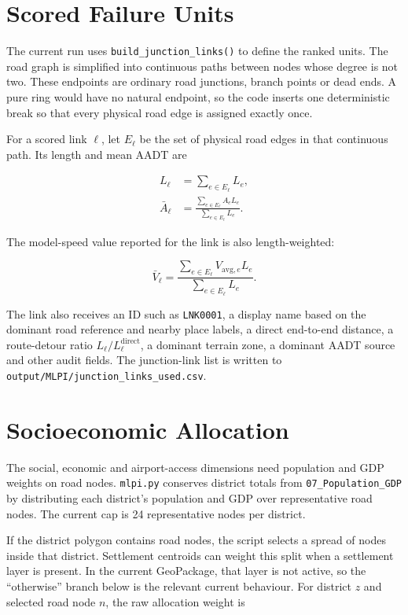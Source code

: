 \documentclass[11pt,a4paper]{article}
\begin{document}
\section{Scored Failure Units}

The current run uses \texttt{build\_junction\_links()} to define the ranked
units. The road graph is simplified into continuous paths between nodes whose
degree is not two. These endpoints are ordinary road junctions, branch points
or dead ends. A pure ring would have no natural endpoint, so the code inserts
one deterministic break so that every physical road edge is assigned exactly
once.

For a scored link $\ell$, let $E_{\ell}$ be the set of physical road edges in
that continuous path. Its length and mean AADT are

\begin{align}
L_{\ell} &= \sum_{e\in E_{\ell}} L_e, \\
\bar{A}_{\ell}
&=\frac{\sum_{e\in E_{\ell}} A_e L_e}
        {\sum_{e\in E_{\ell}} L_e}.
\label{eq:mlpi-link-aadt}
\end{align}

The model-speed value reported for the link is also length-weighted:

\begin{equation}
\bar{V}_{\ell}
=\frac{\sum_{e\in E_{\ell}} V_{\mathrm{avg},e} L_e}
        {\sum_{e\in E_{\ell}} L_e}.
\label{eq:mlpi-link-speed}
\end{equation}

The link also receives an ID such as \texttt{LNK0001}, a display name based on
the dominant road reference and nearby place labels, a direct end-to-end
distance, a route-detour ratio $L_{\ell}/L^{\mathrm{direct}}_{\ell}$, a
dominant terrain zone, a dominant AADT source and other audit fields. The
junction-link list is written to
\texttt{output/MLPI/junction\_links\_used.csv}.

\section{Socioeconomic Allocation}

The social, economic and airport-access dimensions need population and GDP
weights on road nodes. \texttt{mlpi.py} conserves district totals from
\texttt{07\_Population\_GDP} by distributing each district's population and GDP
over representative road nodes. The current cap is 24 representative nodes per
district.

If the district polygon contains road nodes, the script selects a spread of
nodes inside that district. Settlement centroids can weight this split when a
settlement layer is present. In the current GeoPackage, that layer is not active,
so the ``otherwise'' branch below is the relevant current behaviour. For
district $z$ and selected road node $n$, the raw allocation weight is
\end{document}

